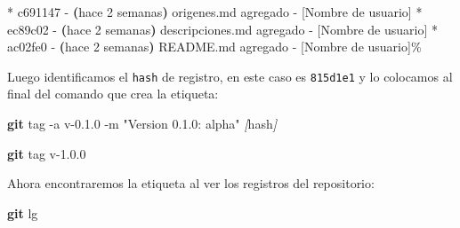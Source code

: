 \documentclass[
]{book}
\newenvironment{Shaded}{\begin{snugshade}}{\end{snugshade}}
\newcommand{\AttributeTok}[1]{\textcolor[rgb]{0.13,0.29,0.53}{#1}}
\newcommand{\ErrorTok}[1]{\textcolor[rgb]{0.64,0.00,0.00}{\textbf{#1}}}
\newcommand{\ExtensionTok}[1]{#1}
\newcommand{\FunctionTok}[1]{\textcolor[rgb]{0.13,0.29,0.53}{\textbf{#1}}}
\newcommand{\KeywordTok}[1]{\textcolor[rgb]{0.13,0.29,0.53}{\textbf{#1}}}
\newcommand{\NormalTok}[1]{#1}
\newcommand{\PreprocessorTok}[1]{\textcolor[rgb]{0.56,0.35,0.01}{\textit{#1}}}
\newcommand{\SpecialStringTok}[1]{\textcolor[rgb]{0.31,0.60,0.02}{#1}}
\newcommand{\StringTok}[1]{\textcolor[rgb]{0.31,0.60,0.02}{#1}}
\begin{document}
\begin{Shaded}
\begin{Highlighting}[]
\ExtensionTok{*}\NormalTok{ c691147 }\AttributeTok{{-}} \ErrorTok{(}\ExtensionTok{hace}\NormalTok{ 2 semanas}\KeywordTok{)} \ExtensionTok{origenes.md}\NormalTok{ agregado }\AttributeTok{{-}}\NormalTok{ [Nombre de usuario]}
\ExtensionTok{*}\NormalTok{ ec89c02 }\AttributeTok{{-}} \ErrorTok{(}\ExtensionTok{hace}\NormalTok{ 2 semanas}\KeywordTok{)} \ExtensionTok{descripciones.md}\NormalTok{ agregado }\AttributeTok{{-}}\NormalTok{ [Nombre de usuario]}
\ExtensionTok{*}\NormalTok{ ac02fe0 }\AttributeTok{{-}} \ErrorTok{(}\ExtensionTok{hace}\NormalTok{ 2 semanas}\KeywordTok{)} \ExtensionTok{README.md}\NormalTok{ agregado }\AttributeTok{{-}}\NormalTok{ [Nombre de usuario]\% }
\end{Highlighting}
\end{Shaded}

Luego identificamos el \texttt{hash} de registro, en este caso es \texttt{815d1e1} y lo colocamos al final del comando que crea la etiqueta:

\begin{Shaded}
\begin{Highlighting}[]
\FunctionTok{git}\NormalTok{ tag }\AttributeTok{{-}a}\NormalTok{ v{-}0.1.0 }\AttributeTok{{-}m} \StringTok{"Version 0.1.0: alpha"} \PreprocessorTok{[}\SpecialStringTok{hash}\PreprocessorTok{]} 
\end{Highlighting}
\end{Shaded}

\begin{Shaded}
\begin{Highlighting}[]
\FunctionTok{git}\NormalTok{ tag v{-}1.0.0 }
\end{Highlighting}
\end{Shaded}

Ahora encontraremos la etiqueta al ver los registros del repositorio:

\begin{Shaded}
\begin{Highlighting}[]
\FunctionTok{git}\NormalTok{ lg}
\end{Highlighting}
\end{Shaded}
\end{document}
